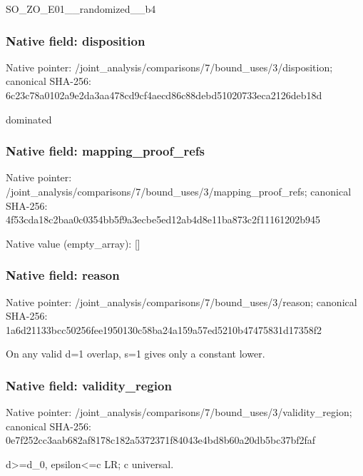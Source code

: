 \documentclass[10pt,a4paper]{article}
\begin{document}
\begingroup\raggedright\sloppy SO\_\allowbreak{}ZO\_\allowbreak{}E01\_\allowbreak{}\_\allowbreak{}randomized\_\allowbreak{}\_\allowbreak{}b4\par\endgroup

\subsubsection{Native field: disposition}
Native pointer: /joint\_\allowbreak{}analysis/comparisons/7/bound\_\allowbreak{}uses/3/disposition; canonical SHA-256: 6c23c78a0102a9e2da3aa478cd9cf4aecd86c88debd51020733eca2126deb18d

\begingroup\raggedright\sloppy dominated\par\endgroup

\subsubsection{Native field: mapping\_\allowbreak{}proof\_\allowbreak{}refs}
Native pointer: /joint\_\allowbreak{}analysis/comparisons/7/bound\_\allowbreak{}uses/3/mapping\_\allowbreak{}proof\_\allowbreak{}refs; canonical SHA-256: 4f53cda18c2baa0c0354bb5f9a3ecbe5ed12ab4d8e11ba873c2f11161202b945

Native value (empty\_\allowbreak{}array): []

\subsubsection{Native field: reason}
Native pointer: /joint\_\allowbreak{}analysis/comparisons/7/bound\_\allowbreak{}uses/3/reason; canonical SHA-256: 1a6d21133bcc50256fee1950130c58ba24a159a57ed5210b47475831d17358f2

\begingroup\raggedright\sloppy On any valid d=\allowbreak{}1 overlap,\allowbreak{} s=\allowbreak{}1 gives only a constant lower.\par\endgroup

\subsubsection{Native field: validity\_\allowbreak{}region}
Native pointer: /joint\_\allowbreak{}analysis/comparisons/7/bound\_\allowbreak{}uses/3/validity\_\allowbreak{}region; canonical SHA-256: 0e7f252cc3aab682af8178c182a5372371f84043e4bd8b60a20db5bc37bf2faf

\begingroup\raggedright\sloppy d>=\allowbreak{}d\_\allowbreak{}0,\allowbreak{} epsilon<=\allowbreak{}c LR;\allowbreak{} c universal.\par\endgroup
\end{document}
